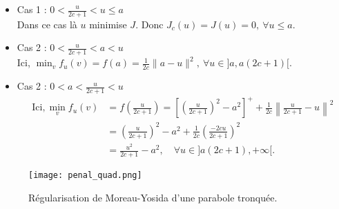\documentclass[main.tex]{subfiles}
\begin{document}
\begin{itemize}
\renewcommand{\labelitemi}{\scriptsize$\bullet$} 
\item Cas 1 : $0 < \frac{u}{2c+1} < u \leq a$\\ %
Dans ce cas là $u$ minimise $J$. Donc $J_c(u)=J(u)=0, \ \forall u \leq a$.

\item Cas 2 : $0 < \frac{u}{2c+1} < a < u \qquad$ 
\\
Ici, $\min_v f_u(v) = f(a) = \frac{1}{2c} \| a-u\|^2, \ \forall u \in ]a,a(2c+1)[.$
\item Cas 2 : $0 < a < \frac{u}{2c+1} < u \qquad$ 
\\
\begin{align*}
\textrm{Ici}, \min_v f_u(v) &= f\left( \frac{u}{2c+1} \right) = \left[ \left( \frac{u}{2c+1} \right)^2 -a^2 \right]^+ + \frac{1}{2c} \left\| \frac{u}{2c+1}-u \right\|^2 \\
& = \left( \frac{u}{2c+1} \right)^2 -a^2 + \frac{1}{2c} \left( \frac{-2cu}{2c+1} \right)^2 \\
& = \frac{u^2}{2c+1} -a^2, \quad \forall u \in ]a(2c+1),+\infty[.
\end{align*}
\end{itemize}
\begin{figure}
\centering
\texttt{[image: penal\_quad.png]}
\caption{\label{fig:regul_para_coupee} Régularisation de Moreau-Yosida d'une parabole tronquée. }
\end{figure}
\end{document}
